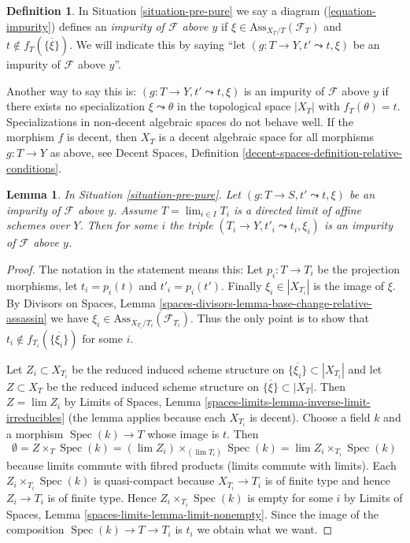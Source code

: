 \documentclass{stacks-project}
\theoremstyle{plain}
\newtheorem{lemma}[subsection]{Lemma}
\theoremstyle{definition}
\newtheorem{definition}[subsection]{Definition}
\theoremstyle{remark}
\numberwithin{equation}{subsection}
\def\lim{\mathop{\mathrm{lim}}\nolimits}
\def\Spec{\mathop{\mathrm{Spec}}}
\begin{document}
\begin{definition}
\label{definition-impurity}
In
Situation \ref{situation-pre-pure}
we say a diagram (\ref{equation-impurity}) defines an
{\it impurity of $\mathcal{F}$ above $y$}
if $\xi \in \text{Ass}_{X_T/T}(\mathcal{F}_T)$ and
$t \not \in f_T(\overline{\{\xi\}})$. We will indicate
this by saying ``let $(g : T \to Y, t' \leadsto t, \xi)$ be
an impurity of $\mathcal{F}$ above $y$''.
\end{definition}

\noindent
Another way to say this is: $(g : T \to Y, t' \leadsto t, \xi)$ is
an impurity of $\mathcal{F}$ above $y$ if there exists no specialization
$\xi \leadsto \theta$ in the topological space $|X_T|$ with
$f_T(\theta) = t$. Specializations in non-decent algebraic spaces
do not behave well. If the morphism $f$ is decent, then $X_T$
is a decent algebraic space for all morphisms $g : T \to Y$ as above, see
Decent Spaces, Definition \ref{decent-spaces-definition-relative-conditions}.

\begin{lemma}
\label{lemma-impure-limit}
In Situation \ref{situation-pre-pure}.
Let $(g : T \to S, t' \leadsto t, \xi)$ be an impurity of
$\mathcal{F}$ above $y$. Assume $T = \lim_{i \in I} T_i$ is a directed limit
of affine schemes over $Y$. Then for some $i$ the triple
$(T_i \to Y, t'_i \leadsto t_i, \xi_i)$ is an impurity of
$\mathcal{F}$ above $y$.
\end{lemma}

\begin{proof}
The notation in the statement means this: Let $p_i : T \to T_i$
be the projection morphisms, let $t_i = p_i(t)$ and $t'_i = p_i(t')$.
Finally $\xi_i \in |X_{T_i}|$ is the image of $\xi$. By
Divisors on Spaces, Lemma
\ref{spaces-divisors-lemma-base-change-relative-assassin}
we have $\xi_i \in \text{Ass}_{X_{T_i}/T_i}(\mathcal{F}_{T_i})$.
Thus the only point is to show that
$t_i \not \in f_{T_i}(\overline{\{\xi_i\}})$ for some $i$.

\medskip\noindent
Let $Z_i \subset X_{T_i}$ be the reduced induced scheme structure
on $\overline{\{\xi_i\}} \subset |X_{T_i}|$
and let $Z \subset X_T$ be the reduced induced scheme structure on
$\overline{\{\xi\}} \subset |X_T|$.
Then $Z = \lim Z_i$ by
Limits of Spaces, Lemma \ref{spaces-limits-lemma-inverse-limit-irreducibles}
(the lemma applies because each $X_{T_i}$ is decent).
Choose a field $k$ and a morphism $\Spec(k) \to T$ whose image is $t$.
Then
$$
\emptyset =
Z \times_T \Spec(k) = (\lim Z_i) \times_{(\lim T_i)} \Spec(k)
= \lim Z_i \times_{T_i} \Spec(k)
$$
because limits commute with fibred products (limits commute with limits).
Each $Z_i \times_{T_i} \Spec(k)$ is quasi-compact because $X_{T_i} \to T_i$
is of finite type and hence $Z_i \to T_i$ is of finite type.
Hence $Z_i \times_{T_i} \Spec(k)$ is empty for some $i$ by
Limits of Spaces, Lemma \ref{spaces-limits-lemma-limit-nonempty}.
Since the image of the composition $\Spec(k) \to T \to T_i$ is $t_i$
we obtain what we want.
\end{proof}
\end{document}
